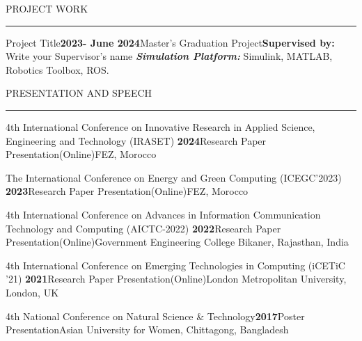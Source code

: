 \documentclass{resume} %
\renewenvironment{rSection}[1]{
\sectionskip
\textcolor{RoyalPurple}{\MakeUppercase{#1}}
\sectionlineskip
\hrule
\begin{list}{}{
\setlength{\leftmargin}{1.5em}
}
\item[]
}{
\end{list}
}
\begin{document}
\begin{rSection}{Project Work}
\begin{rSubsection}{Project Title}{\textbf{2023- June 2024}}{Master's Graduation Project}{\textbf{Supervised by:}  Write your Supervisor's name}
\textit{\textbf{Simulation Platform:}} Simulink, MATLAB, Robotics Toolbox, ROS. \\
\end{rSubsection}






\begin{rSection}{Presentation and Speech}

\begin{rSubsection}{4th International Conference on Innovative Research in Applied Science, Engineering and Technology (IRASET) }{\textbf{2024}}{Research Paper Presentation(Online)}{FEZ, Morocco}\\
\end{rSubsection}

\begin{rSubsection}{The International Conference on Energy and Green Computing (ICEGC’2023)} {\textbf{2023}}{Research Paper Presentation(Online)}{FEZ, Morocco}
\end{rSubsection}

\begin{rSubsection}{4th International Conference on Advances in Information Communication Technology and Computing (AICTC-2022)} {\textbf{2022}}{Research Paper Presentation(Online)}{Government Engineering College Bikaner, Rajasthan, India}
\end{rSubsection}

\begin{rSubsection}{4th International Conference on Emerging Technologies in Computing (iCETiC '21)} {\textbf{2021}}{Research Paper Presentation(Online)}{London Metropolitan University, London, UK}
\end{rSubsection}

\begin{rSubsection}{4th National Conference on Natural Science \& Technology}{\textbf{2017}}{Poster Presentation}{Asian University for Women, Chittagong, Bangladesh}
\end{rSubsection}
\end{rSection}





\end{rSection}
\end{document}
